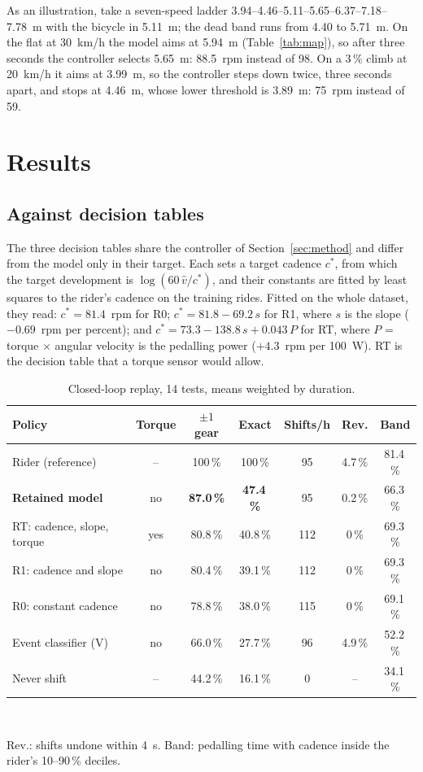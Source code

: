 \documentclass[conference]{IEEEtran}
\newcommand{\vhat}{\hat{v}}
\newcommand{\pct}{\,\%}
\begin{document}
As an illustration, take a seven-speed ladder 3.94--4.46--5.11--5.65--6.37--7.18--7.78~m with the bicycle in 5.11~m; the dead band runs from 4.40 to 5.71~m. On the flat at 30~km/h the model aims at 5.94~m (Table~\ref{tab:map}), so after three seconds the controller selects 5.65~m: 88.5~rpm instead of 98. On a 3\pct{} climb at 20~km/h it aims at 3.99~m, so the controller steps down twice, three seconds apart, and stops at 4.46~m, whose lower threshold is 3.89~m: 75~rpm instead of 59.

\section{Results}\label{sec:results}
\subsection{Against decision tables}
The three decision tables share the controller of Section~\ref{sec:method} and differ from the model only in their target. Each sets a target cadence $c^*$, from which the target development is $\log(60\,\vhat / c^*)$, and their constants are fitted by least squares to the rider's cadence on the training rides. Fitted on the whole dataset, they read: $c^* = 81.4$~rpm for R0; $c^* = 81.8 - 69.2\,s$ for R1, where $s$ is the slope ($-0.69$~rpm per percent); and $c^* = 73.3 - 138.8\,s + 0.043\,P$ for RT, where $P$ = torque $\times$ angular velocity is the pedalling power ($+4.3$~rpm per 100~W). RT is the decision table that a torque sensor would allow.

\begin{table}[t]
\centering
\caption{Closed-loop replay, 14 tests, means weighted by duration.}
\label{tab:main}
\setlength{\tabcolsep}{2.2pt}
\begin{tabular}{@{}lcccccc@{}}
\toprule
Policy & Torque & $\pm1$ gear & Exact & Shifts/h & Rev. & Band \\
\midrule
Rider (reference) & -- & 100\pct & 100\pct & 95 & 4.7\pct & 81.4\pct \\
\textbf{Retained model} & no & \textbf{87.0\pct} & \textbf{47.4\pct} & 95 & 0.2\pct & 66.3\pct \\
RT: cadence, slope, torque & yes & 80.8\pct & 40.8\pct & 112 & 0\pct & 69.3\pct \\
R1: cadence and slope & no & 80.4\pct & 39.1\pct & 112 & 0\pct & 69.3\pct \\
R0: constant cadence & no & 78.8\pct & 38.0\pct & 115 & 0\pct & 69.1\pct \\
Event classifier (V) & no & 66.0\pct & 27.7\pct & 96 & 4.9\pct & 52.2\pct \\
Never shift & -- & 44.2\pct & 16.1\pct & 0 & -- & 34.1\pct \\
\bottomrule
\end{tabular}
\\[2pt]
\parbox{\columnwidth}{\footnotesize Rev.: shifts undone within 4~s. Band: pedalling time with cadence inside the rider's 10--90\pct{} deciles.}
\end{table}
\end{document}
